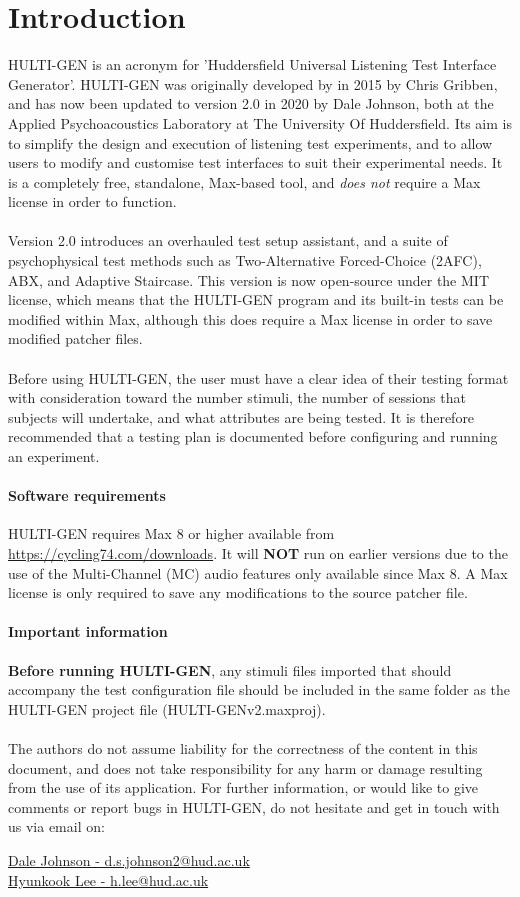 \chapter{Introduction}
HULTI-GEN is an acronym for 'Huddersfield Universal Listening Test Interface Generator'. HULTI-GEN was originally developed by in 2015 by Chris Gribben, and has now been updated to version 2.0 in 2020 by Dale Johnson, both at the Applied Psychoacoustics Laboratory at The University Of Huddersfield. Its aim is to simplify the design and execution of listening test experiments, and to allow users to modify and customise test interfaces to suit their experimental needs. It is a completely free, standalone, Max-based tool, and \emph{does not} require a Max license in order to function. 
\\
\\
Version 2.0 introduces an overhauled test setup assistant, and a suite of psychophysical test methods such as Two-Alternative Forced-Choice (2AFC), ABX, and Adaptive Staircase. This version is now open-source under the MIT license, which means that the HULTI-GEN program and its built-in tests can be modified within Max, although this does require a Max license in order to save modified patcher files.
\\
\\
Before using HULTI-GEN, the user must have a clear idea of their testing format with consideration toward the number stimuli, the number of sessions that subjects will undertake, and what attributes are being tested. It is therefore recommended that a testing plan is documented before configuring and running an experiment.
\subsubsection{Software requirements}
HULTI-GEN requires Max 8 or higher available from \href{https://cycling74.com/downloads}{https://cycling74.com/downloads}. It will \textbf{NOT} run on earlier versions due to the use of the Multi-Channel (MC) audio features only available since Max 8. A Max license is only required to save any modifications to the source patcher file.
\subsubsection{Important information}
\textbf{Before running HULTI-GEN}, any stimuli files imported that should accompany the test configuration file should be included in the same folder as the HULTI-GEN project file (HULTI-GENv2.maxproj).
\\
\\
The authors do not assume liability for the correctness of the content in this document, and does not take responsibility for any harm or damage resulting from the use of its application. For further information, or would like to give comments or report bugs in HULTI-GEN, do not hesitate and get in touch with us via email on:
\begin{center}
\href{mailto::d.s.johnson2@hud.ac.uk}{Dale Johnson - d.s.johnson2@hud.ac.uk}
\\
\href{mailto::h.lee@hud.ac.uk}{Hyunkook Lee - h.lee@hud.ac.uk}
\end{center}
